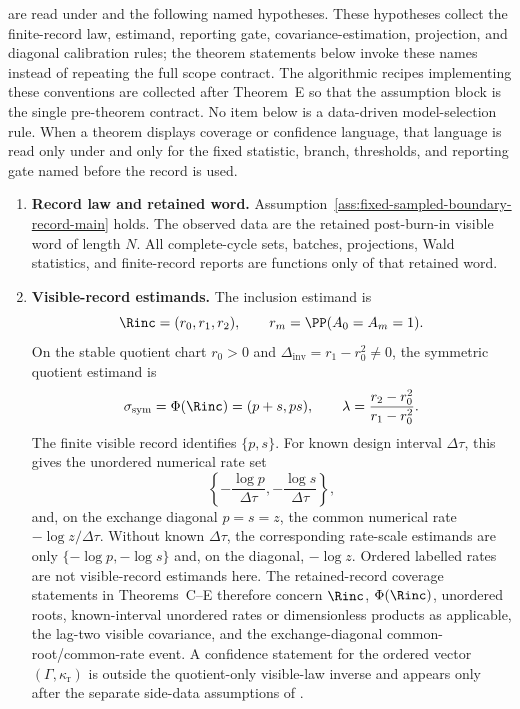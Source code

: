 \begin{assumption}\label{ass:finite-record-master-main}
are read under  and the following named
hypotheses.  These hypotheses collect the finite-record law, estimand,
reporting gate, covariance-estimation, projection, and diagonal calibration
rules; the theorem statements below invoke these names instead of repeating
the full scope contract.
The algorithmic recipes implementing these conventions are collected after
Theorem~E so that the assumption block is the single pre-theorem contract.
No item below is a data-driven model-selection rule.  When a theorem displays
coverage or confidence language, that language is read only under
 and only for the fixed statistic,
branch, thresholds, and reporting gate named before the record is used.

\begin{enumerate}[label=\textup{FR-\arabic*.},ref=FR-\arabic*,leftmargin=3.0em,itemsep=0.45em]
\item\label{fr:law-main}\textbf{Record law and retained word.}
Assumption~\ref{ass:fixed-sampled-boundary-record-main} holds.  The observed
data are the retained post-burn-in visible word of length \(N\).  All
complete-cycle sets, batches, projections, Wald statistics, and finite-record
reports are functions only of that retained word.

\item\label{fr:estimands-main}\textbf{Visible-record estimands.}
The inclusion estimand is
\[
\Rinc=(r_0,r_1,r_2),\qquad r_m=\PP(A_0=A_m=1).
\]
On the stable quotient chart \(r_0>0\) and \(\Delta_{\mathrm{inv}}=r_1-r_0^2\ne0\), the symmetric
quotient estimand is
\[
\sigma_{\rm sym}=\Phi(\Rinc)=(p+s,ps),
\qquad
\lambda=\frac{r_2-r_0^2}{r_1-r_0^2}.
\]
The finite visible record identifies \(\{p,s\}\).  For known design interval
\(\Delta\tau\), this gives the unordered numerical rate set
\[
\left\{-\frac{\log p}{\Delta\tau},-\frac{\log s}{\Delta\tau}\right\},
\]
and, on the exchange diagonal \(p=s=z\), the common numerical rate
\(-\log z/\Delta\tau\).  Without known \(\Delta\tau\), the corresponding
rate-scale estimands are only \(\{-\log p,-\log s\}\) and, on the diagonal,
\(-\log z\).  Ordered labelled rates are not visible-record estimands here.
The retained-record coverage statements in Theorems~C--E therefore concern
\(\Rinc\), \(\Phi(\Rinc)\), unordered roots, known-interval unordered rates or
dimensionless products as applicable, the lag-two visible covariance, and the
exchange-diagonal common-root/common-rate event.  A confidence statement for
the ordered vector \((\Gamma,\kappa_{\mathrm r})\) is outside the quotient-only
visible-law inverse and appears only after the separate side-data assumptions
of .


\end{enumerate}
\end{assumption}
